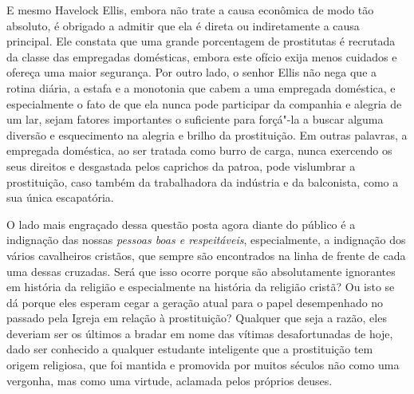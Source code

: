 E mesmo Havelock Ellis, embora não trate a causa econômica de modo tão
absoluto, é obrigado a admitir que ela é direta ou indiretamente a causa
principal. Ele constata que uma grande porcentagem de prostitutas é
recrutada da classe das empregadas domésticas, embora este ofício
exija menos cuidados e ofereça uma maior segurança. Por outro lado, o
senhor Ellis não nega que a rotina diária, a estafa e a monotonia que
cabem a uma empregada doméstica, e especialmente o fato de que ela nunca
pode participar da companhia e alegria de um lar, sejam fatores
importantes o suficiente para forçá"-la a buscar alguma diversão e
esquecimento na alegria e brilho da prostituição. Em outras palavras, a
empregada doméstica, ao ser tratada como burro de carga, nunca exercendo
os seus direitos e desgastada pelos caprichos da patroa, pode vislumbrar
a prostituição, caso também da trabalhadora da indústria e da balconista, como a sua única escapatória.

O lado mais engraçado dessa questão posta agora diante do público é a
indignação das nossas \textit{pessoas boas e respeitáveis}, especialmente, a
indignação dos vários cavalheiros cristãos, que sempre são encontrados na
linha de frente de cada uma dessas cruzadas. Será que isso ocorre porque são absolutamente ignorantes em história da religião e especialmente
na história da religião cristã? Ou isto se dá porque eles esperam cegar
a geração atual para o papel desempenhado no passado pela Igreja em
relação à prostituição? Qualquer que seja a razão, eles deveriam ser os
últimos a bradar em nome das vítimas desafortunadas de hoje, dado ser
conhecido a qualquer estudante inteligente que a prostituição tem origem
religiosa, que foi mantida e promovida por muitos séculos não como uma
vergonha, mas como uma virtude, aclamada pelos próprios deuses.

